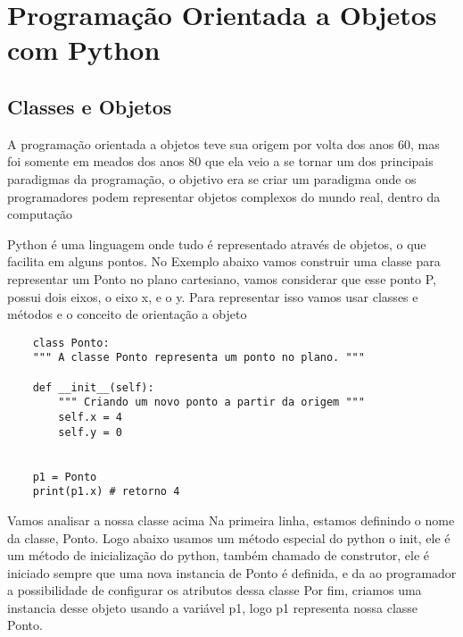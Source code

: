 

\chapter{ Programa\c{c}\~{a}o Orientada a Objetos com Python}



    \section{Classes e Objetos}
    
    A programação orientada a objetos teve sua origem por volta dos anos 60, mas foi somente em meados dos anos 80 que ela veio a se tornar um dos principais paradigmas da programação, o objetivo era se criar um paradigma onde os programadores podem representar objetos complexos do mundo real, dentro da computação  \newline
    
    Python é uma linguagem onde tudo é representado através de objetos, o que facilita em alguns pontos.
    No Exemplo abaixo vamos construir uma classe para representar um Ponto no plano cartesiano, vamos considerar que esse ponto P, possui dois eixos, o eixo x, e o y. Para representar isso vamos usar classes e métodos e o conceito de orientação a objeto

   \begin{lstlisting}
    class Ponto:
    """ A classe Ponto representa um ponto no plano. """

    def __init__(self):
        """ Criando um novo ponto a partir da origem """
        self.x = 4
        self.y = 0
    
    
    p1 = Ponto
    print(p1.x) # retorno 4
    \end{lstlisting}
    Vamos analisar a nossa classe acima \newline
    Na primeira linha, estamos definindo o nome da classe, Ponto.
    Logo abaixo usamos um método especial do python o init, ele é um método de inicialização do python, também chamado de construtor, ele é iniciado sempre que uma nova instancia de Ponto é definida, e da ao programador a possibilidade de configurar os atributos dessa classe
    Por fim, criamos uma instancia desse objeto usando a variável p1, logo p1 representa nossa classe Ponto.
    
